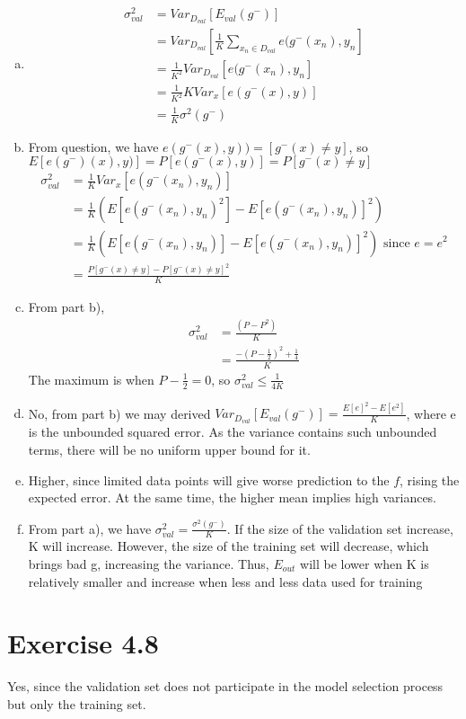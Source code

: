 \documentclass{article}
\def\math#1{$#1$}
\begin{document}
\begin{enumerate}[a)]
    \item 
    \begin{equation}
        \begin{split}
            \sigma^2_{val} &= Var_D_{val}[E_{val}(g^-)] \\
            &= Var_D_{val}[\frac{1}{K}\sum_{x_n\in D_{val}}e(g^-(x_n), y_n] \\
            &= \frac{1}{K^2}Var_D_{val}[e(g^-(x_n), y_n] \\
            &= \frac{1}{K^2}KVar_x[e(g^-(x), y)] \\
            &= \frac{1}{K}\sigma^2(g^-)
            \end{split}
    \end{equation}
    \item From question, we have \math{e(g^-(x), y)) = [g^-(x) \neq y]}, so \math{E[e(g^-)(x), y)] = P[e(g^-(x), y)] = P[g^-(x) \neq y]}
    \begin{equation}
        \begin{split}
             \sigma_{val}^2 &= \frac{1}{K} Var_x[e(g^-(x_n), y_n)] \\
            &= \frac{1}{K}(E[e(g^-(x_n), y_n)^2] - E[e(g^-(x_n), y_n)]^2) \\
            &= \frac{1}{K}(E[e(g^-(x_n), y_n)] - E[e(g^-(x_n), y_n)]^2)
            \text{  since  } e = e^2 \\
            &= \frac{P[g^-(x) \neq y] - P[g^-(x) \neq y]^2}{K}
        \end{split}
    \end{equation}
    \item From part b), 
    \begin{equation}
        \begin{split}
            \sigma^2_{val} &= \frac{(P - P^2)}{K} \\
            &= \frac{-(P - \frac{1}{2})^2 + \frac{1}{4}}{K} 
        \end{split}
    \end{equation}
    The maximum is when \math{P - \frac{1}{2} = 0}, so \math{\sigma^2_{val} \leq \frac{1}{4K}}
    \item No, from part b) we may derived \math{Var_{D_{val}}[E_{val}(g^-)] = \frac{E[e]^2 - E[e^2]}{K}}, where e is the unbounded squared error. As the variance contains such unbounded terms, there will be no uniform upper bound for it.
    \item Higher, since limited data points will give worse prediction to the \math{f}, rising the expected error. At the same time, the higher mean implies high variances.
    \item From part a), we have \math{\sigma_{val}^2 = \frac{\sigma^2(g^-)}{K}}. If the size of the validation set increase, K will increase. However, the size of the training set will decrease, which brings bad g, increasing the variance. Thus, \math{E_{out}} will be lower when K is relatively smaller and increase when less and less data used for training 
\end{enumerate}

\section{Exercise 4.8}

Yes, since the validation set does not participate in the model selection process but only the training set. 
\end{document}
